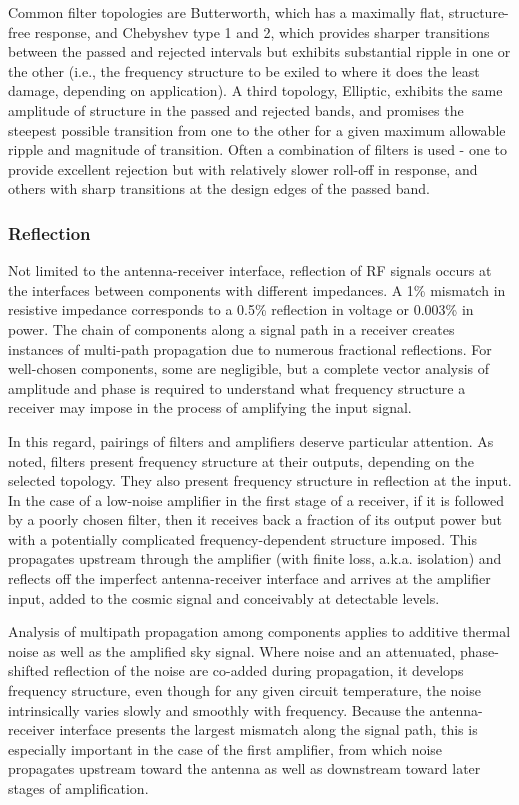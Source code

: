  Common filter topologies are Butterworth, which has a maximally flat, structure-free response, and Chebyshev type 1 and 2, which provides sharper transitions between the passed and rejected intervals but exhibits substantial ripple in one or the other (i.e., the frequency structure to be exiled to where it does the least damage, depending on application).  A third topology, Elliptic, exhibits the same amplitude of structure in the passed and rejected bands, and promises the steepest possible transition from one to the other for a given maximum allowable ripple and magnitude of transition.  Often a combination of filters is used - one to provide excellent rejection but with relatively slower roll-off in response, and others with sharp transitions at the design edges of the passed band.  
   
\subsubsection{Reflection}

Not limited to the antenna-receiver interface, reflection of RF signals occurs at the interfaces between components with different impedances.  A 1\% mismatch in resistive impedance corresponds to a 0.5\% reflection in voltage or 0.003\% in power.  The chain of components along a signal path in a receiver creates instances of multi-path propagation due to numerous fractional reflections.  For well-chosen components, some are negligible, but a complete vector analysis of amplitude and phase is required to understand what frequency structure a receiver may impose in the process of amplifying the input signal.  

In this regard, pairings of filters and amplifiers deserve particular attention.  As noted, filters present frequency structure at their outputs, depending on the selected topology.  They also present frequency structure in reflection at the input. In the case of a low-noise amplifier in the first stage of a receiver, if it is followed by a poorly chosen filter, then it receives back a fraction of its output power but with a potentially complicated frequency-dependent structure imposed.  This propagates upstream through the amplifier (with finite loss, a.k.a. isolation) and reflects off the imperfect antenna-receiver interface and arrives at the amplifier input, added to the cosmic signal and conceivably at detectable levels.

Analysis of multipath propagation among components applies to additive  thermal noise as well as the amplified sky signal.  Where noise and an attenuated, phase-shifted reflection of the noise are co-added during propagation, it develops frequency structure, even though for any given circuit temperature, the noise intrinsically varies slowly and smoothly with frequency.  Because the antenna-receiver interface presents the largest mismatch along the signal path, this is especially important in the case of the first amplifier, from which noise propagates upstream toward the antenna as well as downstream toward later stages of amplification.

